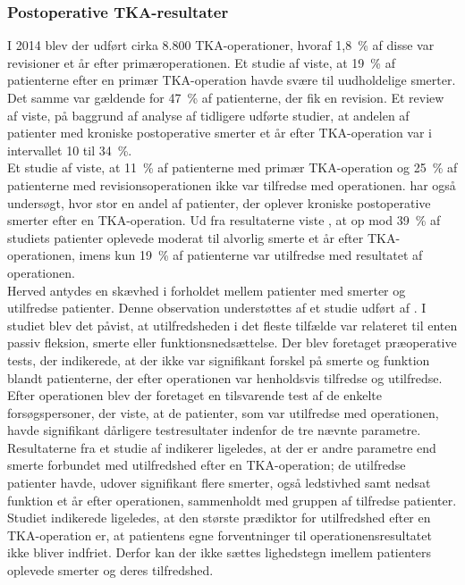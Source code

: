 \subsubsection{Postoperative TKA-resultater} \label{patientermedsmerter}
I 2014 blev der udført cirka 8.800 TKA-operationer, hvoraf 1,8~\% af disse var revisioner et år efter primæroperationen. \citep{aarsrapport2016} Et studie af  viste, at 19~\% af patienterne efter en primær TKA-operation havde svære til uudholdelige smerter. Det samme var gældende for 47~\% af patienterne, der fik en revision. Et review af  viste, på baggrund af analyse af tidligere udførte studier, at andelen af patienter med kroniske postoperative smerter et år efter TKA-operation var i intervallet 10 til 34~\%.\\
Et studie af  viste, at 11~\% af patienterne med primær TKA-operation og 25~\% af patienterne med revisionsoperationen ikke var tilfredse med operationen. \citep{Petersen2015}
 har også undersøgt, hvor stor en andel af patienter, der oplever kroniske postoperative smerter efter en TKA-operation. Ud fra resultaterne viste , at op mod 39~\% af studiets patienter oplevede moderat til alvorlig smerte et år efter TKA-operationen, imens kun 19~\% af patienterne var utilfredse med resultatet af operationen.\\
Herved antydes en skævhed i forholdet mellem patienter med smerter og utilfredse patienter. Denne observation understøttes af et studie udført af . I studiet blev det påvist, at utilfredsheden i det fleste tilfælde var relateret til enten passiv fleksion, smerte eller funktionsnedsættelse. Der blev foretaget præoperative tests, der indikerede, at der ikke var signifikant forskel på smerte og funktion blandt patienterne, der efter operationen var henholdsvis tilfredse og utilfredse. Efter operationen blev der foretaget en tilsvarende test af de enkelte forsøgspersoner, der viste, at de patienter, som var utilfredse med operationen, havde signifikant dårligere testresultater indenfor de tre nævnte parametre. \citep{Jacobs2014} 
Resultaterne fra et studie af  indikerer ligeledes, at der er andre parametre end smerte forbundet med utilfredshed efter en TKA-operation; de utilfredse patienter havde, udover signifikant flere smerter, også ledstivhed samt nedsat funktion et år efter operationen, sammenholdt med gruppen af tilfredse patienter. Studiet indikerede ligeledes, at den største prædiktor for utilfredshed efter en TKA-operation er, at patientens egne forventninger til operationensresultatet ikke bliver indfriet. Derfor kan der ikke sættes lighedstegn imellem patienters oplevede smerter og deres tilfredshed.


